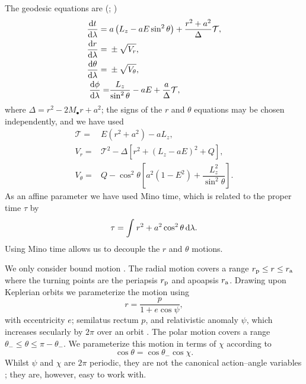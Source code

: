 The geodesic equations are (\citealt{Carter1968}; \citealt[section 62]{Chandrasekhar1992})
\begin{subequations}
\begin{align}
\dfrac{\mathrm{d} {t}}{\mathrm{d} {\lambda}} = {} & a\left(L_z - aE\sin^2 \theta\right) + \dfrac{r^2 + a^2}{\Delta}\mathcal{T},\\
\dfrac{\mathrm{d} {r}}{\mathrm{d} {\lambda}} = {} & \pm \sqrt{V_r},\\
\dfrac{\mathrm{d} {\theta}}{\mathrm{d} {\lambda}} = {} & \pm \sqrt{V_\theta},\\
\dfrac{\mathrm{d} {\phi}}{\mathrm{d} {\lambda}}  = & \dfrac{L_z}{\sin^2 \theta} - aE + \dfrac{a}{\Delta}\mathcal{T},
\end{align}
\end{subequations}
where $\Delta = r^2 - 2M_\bullet r + a^2$; the signs of the $r$ and $\theta$ equations may be chosen independently, and we have used
\begin{subequations}
\begin{align}
\mathcal{T} = {} & E\left(r^2 +a^2\right) - aL_z,\\
V_r = {} & \mathcal{T}^2 - \Delta\left[r^2 + \left(L_z -aE\right)^2 + Q\right],\\
V_\theta = {} & Q - \cos^2 \theta\left[a^2\left(1 - E^2\right) + \dfrac{L_z^2}{\sin^2\theta}\right].
\end{align}
\end{subequations}
As an affine parameter we have used Mino time, which is related to the proper time $\tau$ by \citep{Mino2003}
\begin{equation}
\tau = \int_{}^{}{r^2 + a^2 \cos^2\theta}\,\mathrm{d}{\lambda}.
\end{equation}
Using Mino time allows us to decouple the $r$ and $\theta$ motions.

We only consider bound motion \citep{Wilkins1972}. The radial motion covers a range $r_\mathrm{p} \leq r \leq r_\mathrm{a}$ where the turning points are the periapsis $r_\mathrm{p}$ and apoapsis $r_\mathrm{a}$. Drawing upon Keplerian orbits we parameterize the motion using
\begin{equation}
r = \dfrac{p}{1+e\cos\psi},
\end{equation}
with eccentricity $e$; semilatus rectum $p$, and relativistic anomaly $\psi$, which increases secularly by $2\pi$ over an orbit  \citep{Darwin1961,Drasco2004}. The polar motion covers a range $\theta_- \leq \theta \leq \pi - \theta_-$. We parameterize this motion in terms of $\chi$ according to \citep{Hughes2000}
\begin{equation}
\cos\theta = \cos\theta_-\cos\chi.
\end{equation}
Whilst $\psi$ and $\chi$ are $2\pi$ periodic, they are not the canonical action--angle variables \citep{Schmidt2002}; they are, however, easy to work with.

